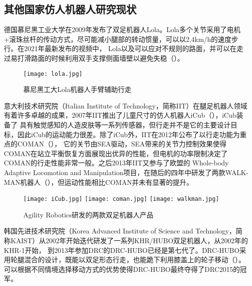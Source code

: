 \subsection{其他国家仿人机器人研究现状}

德国慕尼黑工业大学在2009年发布了双足机器人Lola\cite{buschmann2009humanoid}。Lola多个关节采用了电机+滚珠丝杆的传动方式，尽可能减小腿部的转动惯量，可以以2.4km/h的速度步行。在2021年最新发布的视频中，
Lola以及可以应对不规则的路面，并可以在走过易打滑路面的时候利用双手支撑侧面墙壁以避免失稳\cite{Lola}（）。

\begin{figure}[htbp]
    \centering
    \texttt{[image: lola.jpg]}
    \caption{\label{fig:lola}慕尼黑工大Lola机器人手臂辅助行走}
\end{figure}

意大利技术研究院（Italian Institute of Technology，简称IIT）在腿足机器人领域有着许多卓越的成果，2007年IIT推出了儿童尺寸的仿人机器人iCub\cite{tsagarakis2007icub}（），iCub装备了
具有触觉感知的人造皮肤等一系列传感器，但行走并不是它的主要设计目标，因此iCub的运动能力很差。除了iCub外，IIT在2012年公布了以行走功能为重点的COMAN\cite{dallali2012global}（），
它的关节由SEA驱动，SEA带来的关节力控制效果使得COMAN在站立平衡恢复方面展现出优异的性能，但电机的功率限制决定了COMAN的行走性能非常一般。之后2013年IIT又参与了欧盟的
Whole-body Adaptive Locomotion and Manipulation项目，在随后的四年中研发了两款WALK-MAN机器人\cite{tsagarakis2017walk}（），但运动性能相比COMAN并未有显著的提升。

\begin{figure}[htbp]
    \centering
        {%
            \texttt{[image: iCub.jpg]}}
        {%
            \texttt{[image: coman.jpg]}}
        {%
            \texttt{[image: walkman.jpg]}}            
    \caption{Agility Robotics研发的两款双足机器人产品\label{fig:iit_biped}}
\end{figure}

韩国先进技术研究院（Korea Advanced Institute of Science and Technology，简称KAIST）从2002年开始迭代研发了一系列KHR/HUBO双足机器人，从2002年的KHR-1开始，
到2013年参加DRC的DRC-HUBO已经是第七代了。DRC-HUBO采用轮腿混合的设计，既能以双足形态行走，也能跪下利用膝盖上的轮子移动\cite{zucker2015general}（）。
可以根据不同情境选择移动方式的优势使得DRC-HUBO最终夺得了DRC2015的冠军。

